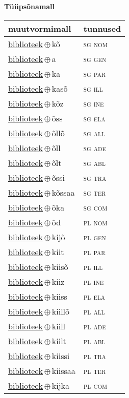 

\vspace{3.5em}
\noindent \begin{minipage}{\textwidth}
\noindent \textbf{Tüüpsõnamall \,}\\

\begin{sideways}
\begin{tabular}{l l}
muutvormimall & tunnused \\
\hline
\underline{biblioteek}\,$\oplus$\,kõ & \textsc{ sg nom } \\
\underline{biblioteek}\,$\oplus$\,a & \textsc{ sg gen } \\
\underline{biblioteek}\,$\oplus$\,ka & \textsc{ sg par } \\
\underline{biblioteek}\,$\oplus$\,kasõ & \textsc{ sg ill } \\
\underline{biblioteek}\,$\oplus$\,kõz & \textsc{ sg ine } \\
\underline{biblioteek}\,$\oplus$\,õss & \textsc{ sg ela } \\
\underline{biblioteek}\,$\oplus$\,õllõ & \textsc{ sg all } \\
\underline{biblioteek}\,$\oplus$\,õll & \textsc{ sg ade } \\
\underline{biblioteek}\,$\oplus$\,õlt & \textsc{ sg abl } \\
\underline{biblioteek}\,$\oplus$\,õssi & \textsc{ sg tra } \\
\underline{biblioteek}\,$\oplus$\,kõssaa & \textsc{ sg ter } \\
\underline{biblioteek}\,$\oplus$\,õka & \textsc{ sg com } \\
\underline{biblioteek}\,$\oplus$\,õd & \textsc{ pl nom } \\
\underline{biblioteek}\,$\oplus$\,kijõ & \textsc{ pl gen } \\
\underline{biblioteek}\,$\oplus$\,kiit & \textsc{ pl par } \\
\underline{biblioteek}\,$\oplus$\,kiisõ & \textsc{ pl ill } \\
\underline{biblioteek}\,$\oplus$\,kiiz & \textsc{ pl ine } \\
\underline{biblioteek}\,$\oplus$\,kiiss & \textsc{ pl ela } \\
\underline{biblioteek}\,$\oplus$\,kiillõ & \textsc{ pl all } \\
\underline{biblioteek}\,$\oplus$\,kiill & \textsc{ pl ade } \\
\underline{biblioteek}\,$\oplus$\,kiilt & \textsc{ pl abl } \\
\underline{biblioteek}\,$\oplus$\,kiissi & \textsc{ pl tra } \\
\underline{biblioteek}\,$\oplus$\,kiissaa & \textsc{ pl ter } \\
\underline{biblioteek}\,$\oplus$\,kijka & \textsc{ pl com } \\
\end{tabular}
\end{sideways}
\label{tab:tüüpsõnamall-biblioteekkõ}

\end{minipage}

